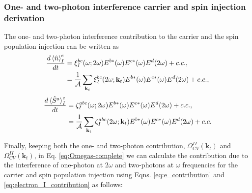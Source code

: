 \documentclass{article}
\newcommand{\kt}{\mathbf{k}_{t}}
\begin{document}
\subsubsection{One- and two-photon interference carrier and spin injection derivation}

The one-  and two-photon interference contribution to the carrier and the spin
population injection can be written as
\begin{equation}\label{eq:int_carrier_population}
\begin{split}
\frac{d\ev*{\hat{n}}^{e}_{I}}{dt} &=
\xi^{bc}_{I}(\omega;2\omega)E^{b*}(\omega)E^{c*}(\omega)E^{d}(2\omega) + c.c., \\
&= \frac{1}{\mathcal{A}}\sum_{\kt}\xi^{bc}_{I}(2\omega;\kt) 
E^{b*}(\omega)E^{c*}(\omega)E^{d}(2\omega) + c.c. ,
\end{split}
\end{equation}
\begin{equation}\label{eq:int_spin_population}
\begin{split}
\frac{d\ev*{\hat{S}^{a}}^{e}_{I}}{dt} &=
\zeta^{abc}_{I}(\omega;2\omega)E^{b*}(\omega)E^{c*}(\omega)E^{d}(2\omega) + c.c. ,\\
&= \frac{1}{\mathcal{A}}\sum_{\kt}\zeta^{abc}_{I}(2\omega;\kt)
E^{b*}(\omega)E^{c*}(\omega)E^{d}(2\omega) + c.c.
\end{split}
\end{equation}

Finally, keeping both the one- and two-photon
contribution, $\Omega^{II}_{CV}(\kt)$ and $\Omega^{II}_{CV}(\kt)$, in Eq.
\eqref{eq:Omegas-complete} we can calculate the contribution due to the
interference of one-photon at $2\omega$ and two-photons at $\omega$ frequencies
for the carrier and spin population injection using Eqns.
\eqref{eq:e_contribution} and \eqref{eq:electron_I_contribution} as follows:
\end{document}
